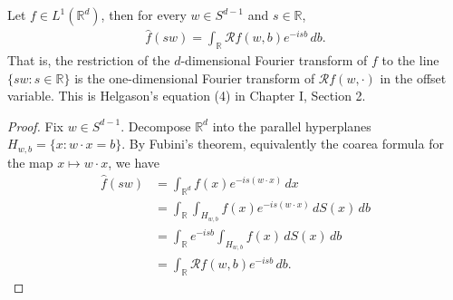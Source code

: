 \begin{theorem}
Let $f\in L^1(\mathbb{R}^d)$, then for every $w\in S^{d-1}$ and $s\in \mathbb{R}$,
\begin{align*}
	\widehat{f}(sw)
	= \int_{\mathbb{R}}\mathcal{R}f(w,b)e^{-isb}\,db.
\end{align*}
That is, the restriction of the $d$-dimensional Fourier transform of $f$ to the line $\{sw:s\in \mathbb{R}\}$ is the one-dimensional Fourier transform of $\mathcal{R}f(w,\cdot)$ in the offset variable. This is Helgason's equation (4) in Chapter I, Section 2.
\end{theorem}
\begin{proof}
Fix $w\in S^{d-1}$. Decompose $\mathbb{R}^d$ into the parallel hyperplanes $H_{w,b}=\{x:w\cdot x=b\}$. By Fubini's theorem, equivalently the coarea formula for the map $x\mapsto w\cdot x$, we have
\begin{align*}
	\widehat{f}(sw)
	&= \int_{\mathbb{R}^d}f(x)e^{-is(w\cdot x)}\,dx\\
	&= \int_{\mathbb{R}}\int_{H_{w,b}} f(x)e^{-is(w\cdot x)}\,dS(x)\,db\\
	&= \int_{\mathbb{R}}e^{-isb}\int_{H_{w,b}} f(x)\,dS(x)\,db\\
	&= \int_{\mathbb{R}}\mathcal{R}f(w,b)e^{-isb}\,db.
\end{align*}
\end{proof}

